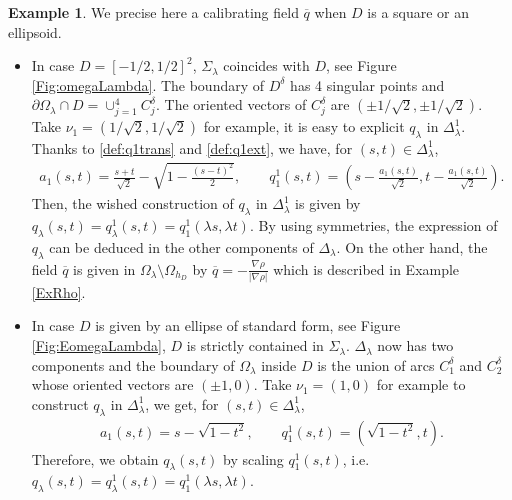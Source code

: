 \documentclass[reqno,11pt]{amsart}
\theoremstyle{definition}
\newtheorem{example}[theorem]{Example}
\numberwithin{equation}{section}
\def\ov{\overline}
\newcommand{\1}{{{\bf 1}\kern-0,28em\rm l}}
\def\O{\Omega}
\def\l{\lambda}
\begin{document}
\bigskip






\begin{example}\label{qexpli}
We precise here a calibrating field $\ov q$ when $D$ is  a square or  an ellipsoid.

\medskip
\begin{itemize}[leftmargin=4mm]
\item[(a)] In  case $D=[-1/2,1/2]^2$,  $\Sigma_\lambda$ coincides with $D$, see Figure \ref{Fig:omegaLambda}. The boundary of $D^\delta$ has 4 singular points and $\partial\Omega_\lambda\cap D = \cup_{j=1}^4 C^\delta_j$. The oriented vectors of $C^\delta_j$ are $(\pm 1/\sqrt{2},\pm 1/\sqrt{2})$. Take $\nu_1 = ( 1/\sqrt{2}, 1/\sqrt{2})$ for example, it is easy to  explicit  $q_\lambda$ in $\Delta_\lambda^1$. Thanks to \eqref{def:q1trans} and \eqref{def:q1ext}, we have, for $(s,t)\in \Delta^1_\lambda $,
\begin{align*}
a_1(s,t) = \frac{s+t}{\sqrt{2}} - \sqrt{1-\frac{(s-t)^2}{2}},
\qquad
q_1^1(s,t)= \left(s - \frac{a_1(s,t)}{\sqrt{2}}, t - \frac{a_1(s,t)}{\sqrt{2}} \right).
\end{align*}
Then, the wished construction of $q_\lambda$ in $\Delta_\l^1$ is given by  $q_\lambda(s,t)=q_\lambda^1(s,t)= q_1^1(\lambda s,\lambda t)$. 
By using symmetries, the expression of  $q_\lambda$ can be deduced in the other components of $\Delta_\lambda$. On the other hand, the field  $\ov q$ 
 is given in $\O_\l\setminus \O_{h_D}$ by $\ov q=-\frac{\nabla \rho}{|\nabla \rho|}$ which is described in Example \ref{ExRho}.


\item[(b)] In case $D$ is given by an ellipse of standard form, see Figure \ref{Fig:EomegaLambda}, $D$ is strictly contained in $\Sigma_\lambda$. $\Delta_\lambda$ now has two components and the boundary of $\Omega_\lambda$ inside $D$ is the union of arcs $C^\delta_1$ and $C^\delta_2$ whose oriented vectors are $(\pm 1,0)$. Take $\nu_1=(1,0)$ for example to construct $q_\lambda$ in $\Delta^1_\lambda$, we get, for $(s,t)\in \Delta^1_\lambda $,
\begin{align*}
a_1(s,t) = s - \sqrt{1-t^2}, \qquad q_1^1(s,t)= \left(\sqrt{1-t^2}, t \right).
\end{align*}
Therefore, we obtain $q_\lambda(s,t)$ by scaling $q_1^1(s,t)$, i.e. $q_\lambda(s,t)=q_\lambda^1(s,t)= q_1^1(\lambda s,\lambda t)$.
\end{itemize}
\end{example}
\end{document}

